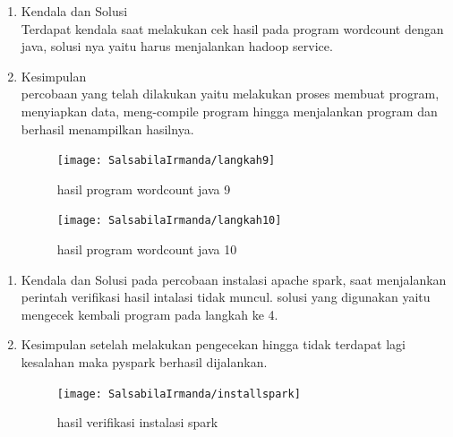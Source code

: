 \begin{enumerate}
\item Kendala dan Solusi \\
Terdapat kendala saat melakukan cek hasil pada program wordcount dengan java, solusi nya yaitu harus menjalankan hadoop service. 

\item Kesimpulan \\
percobaan yang telah dilakukan yaitu melakukan proses membuat program, menyiapkan data, meng-compile program hingga menjalankan program dan berhasil menampilkan hasilnya.

\begin{figure}[!ht]
\texttt{[image: SalsabilaIrmanda/langkah9]}
\caption{hasil program wordcount java 9}
\label{gam:hasil}
\end{figure}

\begin{figure}[!ht]
\texttt{[image: SalsabilaIrmanda/langkah10]}
\caption{hasil program wordcount java 10}
\label{gam:hasil}
\end{figure}
\end{enumerate}

\newpage
{}
\begin{enumerate}
\item Kendala dan Solusi
\newline pada percobaan instalasi apache spark, saat menjalankan perintah verifikasi hasil intalasi tidak muncul. solusi yang digunakan yaitu mengecek kembali program pada langkah ke 4.

\item Kesimpulan
setelah melakukan pengecekan hingga tidak terdapat lagi kesalahan maka pyspark berhasil dijalankan.
\begin{figure}[!ht]
\texttt{[image: SalsabilaIrmanda/installspark]}
\caption{hasil verifikasi instalasi spark}
\label{gam:hasil}
\end{figure}
\end{enumerate}

